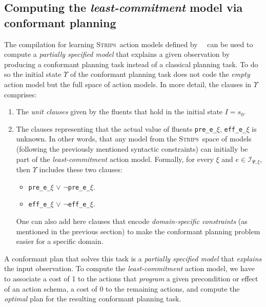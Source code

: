\documentclass{article}
\newcommand{\strips}{\textsc{Strips}}
\begin{document}
\subsection{Computing the {\em least-commitment} model via conformant planning}
The compilation for learning \strips\ action models defined by~\citeauthor{aineto2018learning}~\citeyear{aineto2018learning} can be used to compute a {\em partially specified model} that explains a given observation by producing a conformant planning task instead of a classical planning task. To do so the initial state $\Upsilon$ of the conformant planning task does not code the {\em empty} action model but the full space of action models. In more detail, the clauses in $\Upsilon$ comprises:
      \begin{enumerate}
      \item The {\em unit clauses} given by the fluents that hold in the initial state $I=s_0$.
      \item The clauses representing that the actual value of fluents {\tt\small pre\_e\_$\xi$}, {\tt\small eff\_e\_$\xi$} is unknown. In other words, that any model from the \strips\ space of models (following the previously mentioned syntactic constraints) can initially be part of the {\em least-commitment} action model. Formally, for every $\xi$ and $e\in{\mathcal I}_{\Psi,\xi}$, then $\Upsilon$ includes these two clauses:
            \begin{itemize}
            \item {\tt\small pre\_e\_$\xi$} $\vee$ {\tt\small $\neg$pre\_e\_$\xi$}.
            \item {\tt\small eff\_e\_$\xi$} $\vee$ {\tt\small $\neg$eff\_e\_$\xi$}.
            \end{itemize}
            One can also add here clauses that encode {\em domain-specific constraints} (as mentioned in the previous section) to make the conformant planning problem easier for a specific domain.
      \end{enumerate}
A conformant plan that solves this task is a {\em partially specified model} that {\em explains} the input observation. To compute the {\em least-commitment} action model, we have to associate a cost of 1 to the actions that {\em program} a given precondition or effect of an action schema, a cost of 0 to the remaining actions, and compute the {\em optimal} plan for the resulting conformant planning task.
\end{document}
